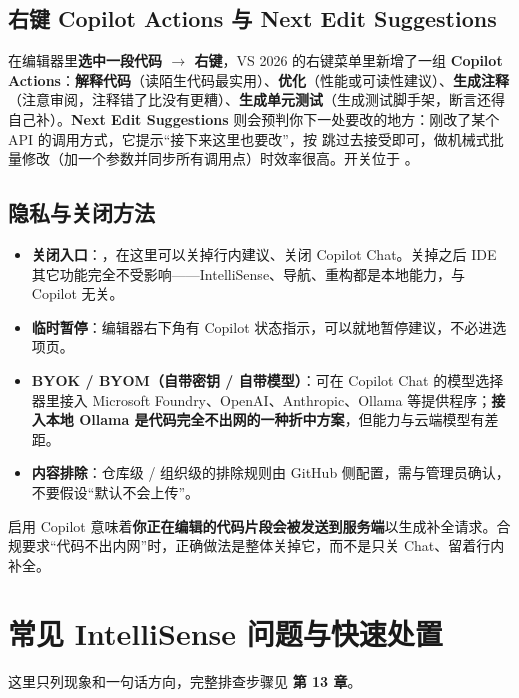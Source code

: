 \subsection{右键 Copilot Actions 与 Next Edit Suggestions}

在编辑器里\textbf{选中一段代码 $\rightarrow$ 右键}，VS 2026 的右键菜单里新增了一组 \textbf{Copilot Actions}：\textbf{解释代码}（读陌生代码最实用）、\textbf{优化}（性能或可读性建议）、\textbf{生成注释}（注意审阅，注释错了比没有更糟）、\textbf{生成单元测试}（生成测试脚手架，断言还得自己补）。\textbf{Next Edit Suggestions} 则会预判你下一处要改的地方：刚改了某个 API 的调用方式，它提示“接下来这里也要改”，按  跳过去接受即可，做机械式批量修改（加一个参数并同步所有调用点）时效率很高。开关位于 。

\subsection{隐私与关闭方法}

\begin{itemize}
  \item \textbf{关闭入口}：，在这里可以关掉行内建议、关闭 Copilot Chat。关掉之后 IDE 其它功能完全不受影响——IntelliSense、导航、重构都是本地能力，与 Copilot 无关。
  \item \textbf{临时暂停}：编辑器右下角有 Copilot 状态指示，可以就地暂停建议，不必进选项页。
  \item \textbf{BYOK / BYOM（自带密钥 / 自带模型）}：可在 Copilot Chat 的模型选择器里接入 Microsoft Foundry、OpenAI、Anthropic、Ollama 等提供程序；\textbf{接入本地 Ollama 是代码完全不出网的一种折中方案}，但能力与云端模型有差距。
  \item \textbf{内容排除}：仓库级 / 组织级的排除规则由 GitHub 侧配置，需与管理员确认，不要假设“默认不会上传”。
\end{itemize}

\begin{warnbox}[注意]
启用 Copilot 意味着\textbf{你正在编辑的代码片段会被发送到服务端}以生成补全请求。合规要求“代码不出内网”时，正确做法是整体关掉它，而不是只关 Chat、留着行内补全。
\end{warnbox}

\section{常见 IntelliSense 问题与快速处置}

这里只列现象和一句话方向，完整排查步骤见 \textbf{第 13 章}。

